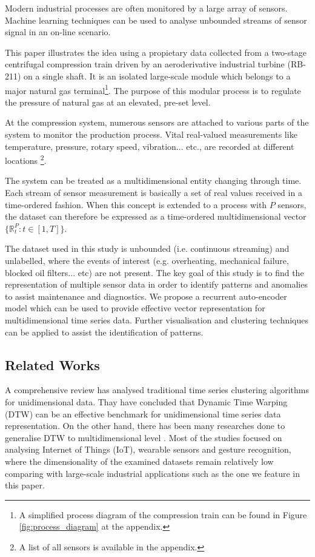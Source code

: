 \documentclass[runningheads]{llncs}
\begin{document}
Modern industrial processes are often monitored by a large array of sensors. Machine learning techniques can be used to analyse unbounded streams of sensor signal in an on-line scenario.

This paper illustrates the idea using a propietary data collected from a two-stage centrifugal compression train driven by an aeroderivative industrial turbine (RB-211) on a single shaft. It is an isolated large-scale module which belongs to a major natural gas terminal\footnote{A simplified process diagram of the compression train can be found in Figure \ref{fig:process_diagram} at the appendix.}. The purpose of this modular process is to regulate the pressure of natural gas at an elevated, pre-set level.
	
At the compression system, numerous sensors are attached to various parts of the system to monitor the production process. Vital real-valued measurements like temperature, pressure, rotary speed, vibration... etc., are recorded at different locations \footnote{A list of all sensors is available in the appendix.}.

The system can be treated as a multidimensional entity changing through time. Each stream of sensor measurement is basically a set of real values received in a time-ordered fashion. When this concept is extended to a process with \(P\) sensors, the dataset can therefore be expressed as a time-ordered multidimensional vector \( \{ \mathbb{R}_t^P:t\in [1,T] \} \).

The dataset used in this study is unbounded (i.e. continuous streaming) and unlabelled, where the events of interest (e.g. overheating, mechanical failure, blocked oil filters... etc) are not present. The key goal of this study is to find the representation of multiple sensor data in order to identify patterns and anomalies to assist maintenance and diagnostics. We propose a recurrent auto-encoder model which can be used to provide effective vector representation for multidimensional time series data. Further visualisation and clustering techniques can be applied to assist the identification of patterns.

\subsection{Related Works}

A comprehensive review \cite{bakeoff} has analysed traditional time series clustering algorithms for unidimensional data. Thay have concluded that Dynamic Time Warping (DTW) can be an effective benchmark for unidimensional time series data representation. On the other hand, there has been many researches done to generalise DTW to multidimensional level \cite{vlachos,gillian,holt,ko,petitjean,liu,wang,Shokoohi,giorgino}. Most of the studies focused on analysing Internet of Things (IoT), wearable sensors and gesture recognition, where the dimensionality of the examined datasets remain relatively low comparing with large-scale industrial applications such as the one we feature in this paper. 
\end{document}
